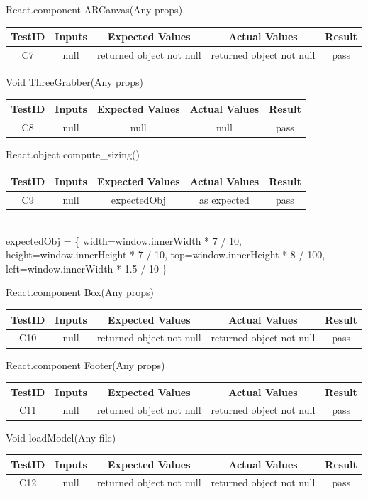 \documentclass[12pt, oneside, openany, titlepage]{article}
\begin{document}
React.component ARCanvas(Any props) \\
\begin{tabular}{ |c|c|c|c|c| } 
 \hline
 TestID & Inputs & Expected Values & Actual Values & Result \\ 
 \hline
 C7 & null & returned object not null & returned object not null & pass \\ 
 \hline
\end{tabular}

Void ThreeGrabber(Any props) \\
\begin{tabular}{ |c|c|c|c|c| } 
 \hline
 TestID & Inputs & Expected Values & Actual Values & Result \\ 
 \hline
 C8 & null & null & null & pass \\ 
 \hline
\end{tabular}

React.object compute\_sizing() \\
\begin{tabular}{ |c|c|c|c|c| } 
 \hline
 TestID & Inputs & Expected Values & Actual Values & Result \\ 
 \hline
 C9 & null & expectedObj & as expected & pass \\ 
 \hline
\end{tabular}
\\
expectedObj = \{ width=window.innerWidth * 7 / 10, height=window.innerHeight * 7 / 10, top=window.innerHeight * 8 / 100, left=window.innerWidth * 1.5 / 10 \}

React.component Box(Any props) \\
\begin{tabular}{ |c|c|c|c|c| } 
 \hline
 TestID & Inputs & Expected Values & Actual Values & Result \\ 
 \hline
 C10 & null & returned object not null & returned object not null & pass \\ 
 \hline
\end{tabular}

React.component Footer(Any props) \\
\begin{tabular}{ |c|c|c|c|c| } 
 \hline
 TestID & Inputs & Expected Values & Actual Values & Result \\ 
 \hline
 C11 & null & returned object not null & returned object not null & pass \\ 
 \hline
\end{tabular}

Void loadModel(Any file) \\
\begin{tabular}{ |c|c|c|c|c| } 
 \hline
 TestID & Inputs & Expected Values & Actual Values & Result \\ 
 \hline
 C12 & null & returned object not null & returned object not null & pass \\ 
 \hline
\end{tabular}
\end{document}
